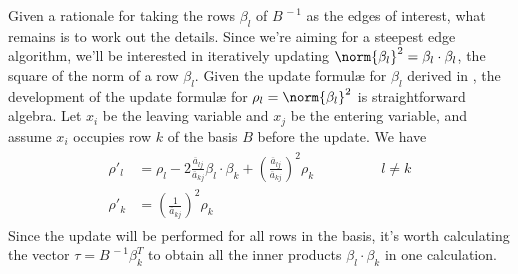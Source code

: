 Given a rationale for taking the rows $\beta_l$ of $B^{\,-1}$ as the
edges of interest, what remains is to work out the details.
Since we're aiming for a steepest edge algorithm, we'll be interested in
iteratively updating $\norm{\beta_l}^2 = \beta_l \cdot \beta_l$, the square
of the norm of a row $\beta_l$.
Given the update formul\ae{} for $\beta_l$ derived in
,
the development of the update formul\ae{} for $\rho_l = \norm{\beta_l}^2$ is
straightforward algebra.
Let $x_i$ be the leaving variable and $x_j$ be the entering variable, and
assume $x_i$ occupies row $k$ of the basis $B$ before the update.
We have
\begin{align}
\begin{alignedat}{2}
\rho'_l & = \rho_l -
	    2\frac{\overline{a}_{lj}}{\overline{a}_{kj}}\beta_l\cdot\beta_k +
	    (\frac{\overline{a}_{lj}}{\overline{a}_{kj}})^2\rho_k &
	    \qquad\qquad l \neq k \\
\rho'_k & = (\frac{1}{\overline{a}_{kj}})^2\rho_k
\end{alignedat}
\end{align}
Since the update will be performed for all rows in the basis, it's worth
calculating the vector $\tau = B^{\,-1}\beta^T_k$ to obtain all the inner
products $\beta_l \cdot \beta_k$ in one calculation.
